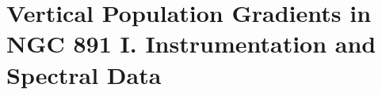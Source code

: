 


\chapter[NGC 891: Observations and spectral data]{Vertical Population
  Gradients in NGC 891 I. Instrumentation and Spectral Data}
\label{chap:891_1}

\cleardoublepage

